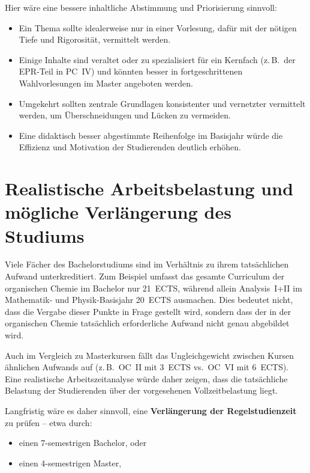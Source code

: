 \documentclass[a4paper]{article}
\begin{document}
Hier wäre eine bessere inhaltliche Abstimmung und Priorisierung sinnvoll:

\begin{itemize}
  \item Ein Thema sollte idealerweise nur in einer Vorlesung, dafür mit der nötigen Tiefe und Rigorosität, vermittelt werden.
  \item Einige Inhalte sind veraltet oder zu spezialisiert für ein Kernfach (z.\,B.\ der EPR-Teil in PC~IV) und könnten besser in fortgeschrittenen Wahlvorlesungen im Master angeboten werden.
  \item Umgekehrt sollten zentrale Grundlagen konsistenter und vernetzter vermittelt werden, um Überschneidungen und Lücken zu vermeiden.
  \item Eine didaktisch besser abgestimmte Reihenfolge im Basisjahr würde die Effizienz und Motivation der Studierenden deutlich erhöhen.
\end{itemize}

\section{Realistische Arbeitsbelastung und mögliche Verlängerung des Studiums}

Viele Fächer des Bachelorstudiums sind im Verhältnis zu ihrem tatsächlichen Aufwand unterkreditiert. Zum Beispiel umfasst das gesamte Curriculum der organischen Chemie im Bachelor nur 21~ECTS, während allein Analysis~I+II im Mathematik- und Physik-Basisjahr 20~ECTS ausmachen. Dies bedeutet nicht, dass die Vergabe dieser Punkte in Frage gestellt wird, sondern dass der in der organischen Chemie tatsächlich erforderliche Aufwand nicht genau abgebildet wird.

Auch im Vergleich zu Masterkursen fällt das Ungleichgewicht zwischen Kursen ähnlichen Aufwands auf (z.\,B.\ OC~II mit 3~ECTS vs.\ OC~VI mit 6~ECTS). Eine realistische Arbeitszeitanalyse würde daher zeigen, dass die tatsächliche Belastung der Studierenden über der vorgesehenen Vollzeitbelastung liegt.

Langfristig wäre es daher sinnvoll, eine \textbf{Verlängerung der Regelstudienzeit} zu prüfen – etwa durch:

\begin{itemize}
  \item einen 7-semestrigen Bachelor, oder
  \item einen 4-semestrigen Master,
\end{itemize}
\end{document}
